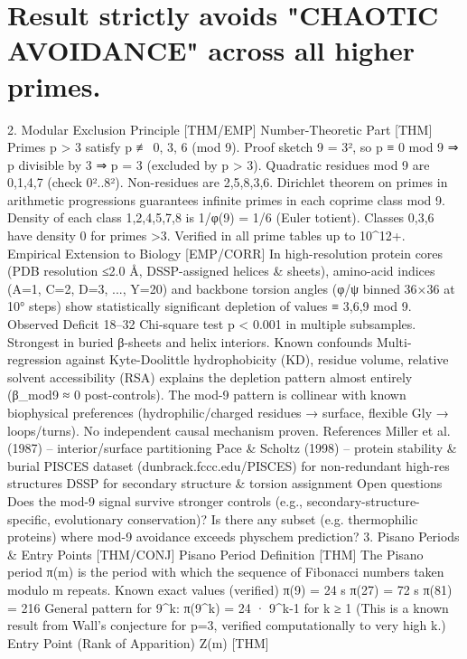 \section{Result strictly avoids "CHAOTIC AVOIDANCE" across all higher primes.}
2. Modular Exclusion Principle [THM/EMP]
Number-Theoretic Part [THM]
Primes p > 3 satisfy p ≢ 0, 3, 6 (mod 9).
Proof sketch
9 = 3², so p ≡ 0 mod 9 ⇒ p divisible by 3 ⇒ p = 3 (excluded by p > 3).
Quadratic residues mod 9 are 0,1,4,7 (check 0²..8²).
Non-residues are 2,5,8,3,6.
Dirichlet theorem on primes in arithmetic progressions guarantees infinite primes in each coprime class mod 9.
Density of each class {1,2,4,5,7,8} is 1/φ(9) = 1/6 (Euler totient).
Classes 0,3,6 have density 0 for primes >3.
Verified in all prime tables up to 10^12+.
Empirical Extension to Biology [EMP/CORR]
In high-resolution protein cores (PDB resolution ≤2.0 Å, DSSP-assigned helices & sheets), amino-acid indices (A=1, C=2, D=3, ..., Y=20) and backbone torsion angles (φ/ψ binned 36×36 at 10° steps) show statistically significant depletion of values ≡ 3,6,9 mod 9.
Observed
Deficit 18–32%
Chi-square test p < 0.001 in multiple subsamples.
Strongest in buried β-sheets and helix interiors.
Known confounds
Multi-regression against Kyte-Doolittle hydrophobicity (KD), residue volume, relative solvent accessibility (RSA) explains the depletion pattern almost entirely (β_mod9 ≈ 0 post-controls).
The mod-9 pattern is collinear with known biophysical preferences (hydrophilic/charged residues → surface, flexible Gly → loops/turns).
No independent causal mechanism proven.
References
Miller et al. (1987) – interior/surface partitioning
Pace & Scholtz (1998) – protein stability & burial
PISCES dataset (dunbrack.fccc.edu/PISCES) for non-redundant high-res structures
DSSP for secondary structure & torsion assignment
Open questions
Does the mod-9 signal survive stronger controls (e.g., secondary-structure-specific, evolutionary conservation)?
Is there any subset (e.g. thermophilic proteins) where mod-9 avoidance exceeds physchem prediction?
3. Pisano Periods & Entry Points [THM/CONJ]
Pisano Period Definition [THM]
The Pisano period π(m) is the period with which the sequence of Fibonacci numbers taken modulo m repeats.
Known exact values (verified)
π(9) = 24 s
π(27) = 72 s
π(81) = 216
General pattern for 9^k: π(9^k) = 24 · 9^{k-1} for k ≥ 1
(This is a known result from Wall's conjecture for p=3, verified computationally to very high k.)
Entry Point (Rank of Apparition) Z(m) [THM]
